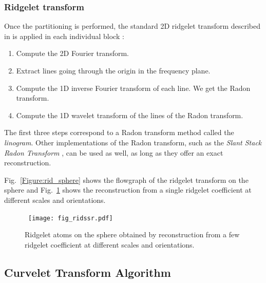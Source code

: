 \subsubsection*{Ridgelet transform}

Once the partitioning is performed, the standard 2D ridgelet transform described in \citep{starck:sta02_3} is applied in each individual block :
\begin{enumerate}
\item Compute the 2D Fourier transform.
\item Extract lines going through the origin in the frequency plane.
\item Compute the 1D inverse Fourier transform of each line. We get the Radon transform.
\item Compute the 1D wavelet transform of the lines of the Radon transform.
\end{enumerate}
The first three steps correspond to a Radon transform method called the {\it linogram}. Other implementations of the Radon transform, such as 
the {\it Slant Stack Radon Transform} \citep{cur:donoho_02}, can be used as well, as long as they offer an exact reconstruction.
   
Fig.~\ref{Figure:rid_sphere} shows the flowgraph of the ridgelet transform 
on the sphere and Fig.~\ref{Figure:back_rid} shows the reconstruction from a single ridgelet 
coefficient at different scales and orientations.

\begin{figure}[htb]
\centerline{
\hbox{
\texttt{[image: fig\_ridssr.pdf]}
}}
\caption{Ridgelet atoms on the sphere obtained by reconstruction from a few ridgelet coefficient at different scales and orientations.}
\label{Figure:back_rid}
\end{figure}
 
 \subsection{Curvelet Transform Algorithm}

